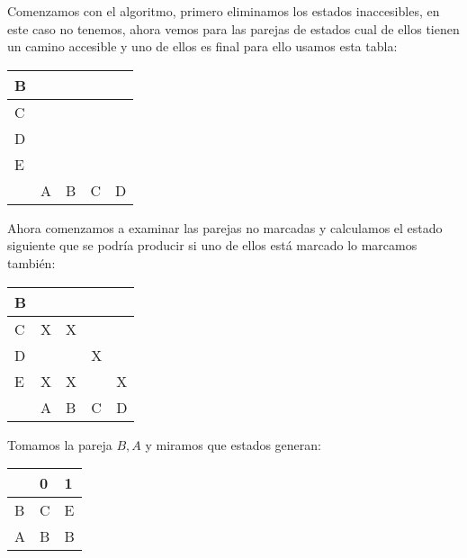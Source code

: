 \documentclass{article}
\begin{document}
Comenzamos con el algoritmo, primero eliminamos los estados inaccesibles, en este caso no tenemos, ahora vemos para las parejas de estados cual de ellos tienen un camino accesible y uno de ellos es final para ello usamos esta tabla:

\begin{table}[h]
\centering
\begin{tabular}{|lllll|}
\hline
B &\multicolumn{1}{|l|}{} &  &  &  \\
 \hline
C &\multicolumn{1}{|l|}{} & \multicolumn{1}{l|}{} &  &  \\
 \hline
D &\multicolumn{1}{|l|}{}& \multicolumn{1}{l|}{} & \multicolumn{1}{|l|}{} &  \\
 \hline
E &\multicolumn{1}{|l|}{} & \multicolumn{1}{l|}{} &\multicolumn{1}{|l|}{}  & \multicolumn{1}{l|}{}\\
\hline
 & \multicolumn{1}{|l|}{A} & \multicolumn{1}{|l|}{B} & \multicolumn{1}{|l|}{C} & \multicolumn{1}{|l|}{D} \\
\hline
\end{tabular}
\end{table}

Ahora comenzamos a examinar las parejas no marcadas y calculamos el estado siguiente que se podría producir si uno de ellos está marcado lo marcamos también:\\
\newpage
\begin{table}[h]
\centering
\begin{tabular}{|lllll|}
\hline
B &\multicolumn{1}{|l|}{} &  &  &  \\
 \hline
C &\multicolumn{1}{|l|}{X} & \multicolumn{1}{l|}{X} &  &  \\
 \hline
D &\multicolumn{1}{|l|}{}& \multicolumn{1}{l|}{} & \multicolumn{1}{|l|}{X} &  \\
 \hline
E &\multicolumn{1}{|l|}{X} & \multicolumn{1}{l|}{X} &\multicolumn{1}{|l|}{}  & \multicolumn{1}{l|}{X}\\
\hline
 & \multicolumn{1}{|l|}{A} & \multicolumn{1}{|l|}{B} & \multicolumn{1}{|l|}{C} & \multicolumn{1}{|l|}{D} \\
\hline
\end{tabular}
\end{table}
Tomamos la pareja $B, A$ y miramos que estados generan:

\begin{table}[h]
\centering
\begin{tabular}{|l|l|l|}
\hline
& 0 & 1 \\
\hline
B & C & E \\
\hline
A & B & B \\
 \hline
\end{tabular}
\end{table}
\end{document}
